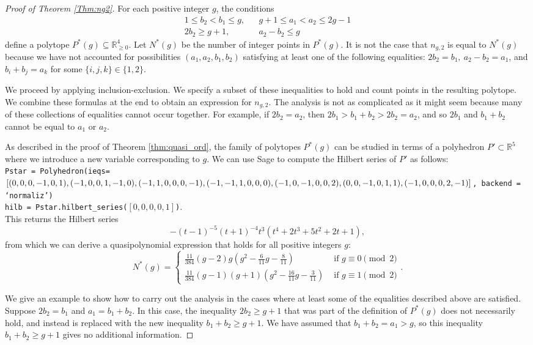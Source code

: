\documentclass[12pt]{amsart}
\newcommand{\R}{{\mathbb R}}
\theoremstyle{plain}\newtheorem{proposition}{Proposition}[section]
\begin{document}
\begin{proof}[Proof of Theorem \ref{Thm:ng2}]
For each positive integer $g$, the conditions 
\begin{eqnarray*}
1 \le b_2 < b_1  \le g, & &g+1 \le a_1 < a_2 \le 2g-1 \\
2b_2 \ge g+1, & & a_2 - b_2 \le g
\end{eqnarray*}
define a polytope $P^*(g) \subseteq \R_{\ge 0}^4$.  Let $N^*(g)$ be the number of integer points in $P^*(g)$.  It is not the case that $n_{g,2}$ is equal to $N^*(g)$ because we have not accounted for possibilities $(a_1,a_2,b_1,b_2)$ satisfying at least one of the following equalities: $2b_2 = b_1,\ a_2 - b_2 = a_1$, and $b_i+b_j = a_k$ for some $\{i,j,k\} \in \{1,2\}$.  

We proceed by applying inclusion-exclusion.  We specify a subset of these inequalities to hold and count points in the resulting polytope.  We combine these formulas at the end to obtain an expression for $n_{g,2}$.  The analysis is not as complicated as it might seem because many of these collections of equalities cannot occur together.  For example, if $2b_2 = a_2$, then $2b_1 > b_1 + b_2 > 2b_2 = a_2$, and so $2b_1$ and $b_1 + b_2$ cannot be equal to $a_1$ or $a_2$.

As described in the proof of Theorem \ref{thm:quasi_ord}, the family of polytopes $P^*(g)$ can be studied in terms of a polyhedron $P' \subset \R^5$ where we introduce a new variable corresponding to $g$.  We can use Sage to compute the Hilbert series of $P'$ as follows:\\
\texttt{\small{Pstar = Polyhedron(ieqs=$[(0,0,0,-1,0,1),(-1,0,0,1,-1,0),(-1,1,0,0,0,-1),\\
(-1,-1,1,0,0,0),(-1,0,-1,0,0,2),(0,0,-1,0,1,1),(-1,0,0,0,2,-1)]$, backend = `normaliz')\\
hilb = Pstar.hilbert\_series($[0,0,0,0,1]$)}}.\\
This returns the Hilbert series 
\[
-(t - 1)^{-5}  (t + 1)^{-4}  t^{3}  (t^{4} + 2t^{3} + 5t^{2} + 2t + 1),
\]
from which we can derive a quasipolynomial expression that holds for all positive integers $g$:
\[
N^*(g) = \begin{cases}
\frac{11}{384} (g - 2)  g  \left(g^2 - \frac{6}{11}g - \frac{8}{11}\right)
& \text{ if } g \equiv 0 \pmod{2} \\
\frac{11}{384}  (g - 1)  (g + 1)  \left(g^2 - \frac{16}{11}g - \frac{3}{11}\right)
& \text{ if } g \equiv 1 \pmod{2} 
\end{cases}.
\]

We give an example to show how to carry out the analysis in the cases where at least some of the equalities described above are satisfied.  Suppose $2b_2 = b_1$ and $a_1 = b_1+b_2$.  In this case, the inequality $2b_2 \ge g+1$ that was part of the definition of $P^*(g)$ does not necessarily hold, and instead is replaced with the new inequality $b_1+b_2 \ge g + 1$.  We have assumed that $b_1 + b_2 = a_1 > g$, so this inequality $b_1+b_2 \ge g +1$ gives no additional information.



\end{proof}
\end{document}
